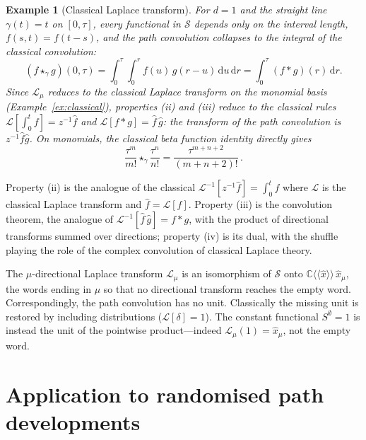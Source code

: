 \documentclass[11pt,a4paper]{article}
\newtheorem{example}[theorem]{Example}
\newcommand{\xh}{\hat{x}}
\newcommand{\cL}{\mathcal{L}}
\newcommand{\dd}{\mathrm{d}}
\begin{document}
\begin{example}[Classical Laplace transform]\label{ex:classical-reduction} For $d=1$ and the straight line $\gamma(t)=t$ on $[0,\tau]$, every functional in $\mathcal S$ depends only on the interval length, $f(s,t)=f(t-s)$, and the path convolution collapses to the integral of the classical convolution:
\begin{equation}
  (f\star_\gamma g)(0,\tau)  = \int_0^\tau\!\!\int_0^r f(u)\,g(r-u)\,\dd u\,\dd r  = \int_0^\tau (f*g)(r)\,\dd r .
\end{equation}
Since $\cL_\mu$ reduces to the classical Laplace transform on the monomial basis (Example~\ref{ex:classical}), properties (ii) and (iii) reduce to the classical rules $\cL[\int_0^t f]=z^{-1}\hat f$ and $\cL[f*g]=\hat f\,\hat g$: the transform of the path convolution is $z^{-1}\hat f\hat g$. On monomials, the classical beta function identity directly gives 
 \begin{equation}
 \frac{\tau^m}{m!}\star_\gamma\frac{\tau^n}{n!}  =\frac{\tau^{m+n+2}}{(m+n+2)!}\,.
 \end{equation}
\end{example}

Property (ii) is the analogue of the classical $\cL^{-1}[z^{-1}\hat f]=\int_0^t f$ where $\mathcal{L}$ is the classical Laplace transform and $\hat{f}=\cL[f]$. Property (iii) is the convolution theorem, the analogue of $\cL^{-1}[\hat f\,\hat g]=f*g$, with the product of directional transforms summed over directions; property (iv) is its dual, with the shuffle playing the role of the complex convolution of classical Laplace theory.


The $\mu$-directional Laplace transform $\cL_\mu$ is an isomorphism of $\mathcal S$ onto $\mathbb{C}\langle\langle\xh\rangle\rangle\,\xh_\mu$, the words ending in $\mu$ so that no directional transform reaches the empty word. Correspondingly, the path convolution has no unit. Classically the missing unit is restored by including distributions ($\cL[\delta]=1$). The constant functional $S^{\emptyset} = 1$ is instead the unit of the pointwise product---indeed $\cL_\mu(1)=\xh_\mu$, not the empty word.





\section{Application to randomised path developments}\label{sec:spectral}
\end{document}
